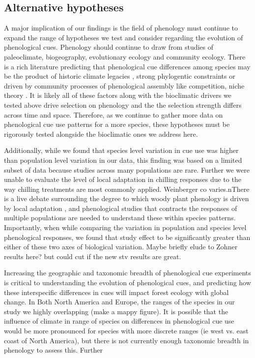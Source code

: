 \documentclass[12pt]{article}\usepackage[]{graphicx}\usepackage[]{color}
\begin{document}
\subsection*{Alternative hypotheses}

A major implication of our findings is the field of phenology must continue to expand the range of hypotheses we test and consider regarding the evolution of phenological cues. Phenology should continue to draw from studies of paleoclimate, biogeography, evolutionary ecology and community ecology. There is a rich literature predicting that phenological cue differences among species may be the product of historic climate legacies \citep{}, strong phylogentic constraints \citep{} or driven by community processes of phenological assembly like competition, niche theory  \citep{}. It is likely all of these factors along with the bioclimatic drivers we tested above drive selection on phenology and the the selection strength differs across time and space. Therefore, as we continue to gather more data on phenological cue use patterns for a more species, these hypotheses must be rigorously tested alongside the bioclimatic ones we address here.

\noindent Additionally, while we found that species level variation in cue use was higher than population level variation in our data, this finding was based on a limited subset of data because studies across many populations are rare. Further we were unable to evaluate the level of local adaptation in chilling responses due to the way chilling treatments are most commonly applied. Weinberger co varies.nThere is a live debate surrounding the degree to which woody plant phenology is driven by local adaptation \citep{}, and phenological studies that contracts the responses of multiple populations are needed to understand these within species patterns. Importantly, when while comparing the variation in population and species level phenological responses, we found that  study effect to be significantly greater than either of these two axes of biological variation. Maybe briefly elude to Zohner results here? but could cut if the new stv results are great. 

Increasing the geographic and taxonomic breadth of phenological cue experiments is critical to understanding the evolution of phenological cues, and predicting how these interspecific differences in cues will impact forest ecology with global change. In Both North America and Europe, the ranges of the species in our study we highly overlapping (make a mappy figure). It is possible that the influence of climate in range of species on differences in phenological cue use would be more pronounced for species with more discrete ranges (ie west vs. east coast of North America), but there is not currently enough taxonomic breadth in phenology to assess this. Further
\end{document}
